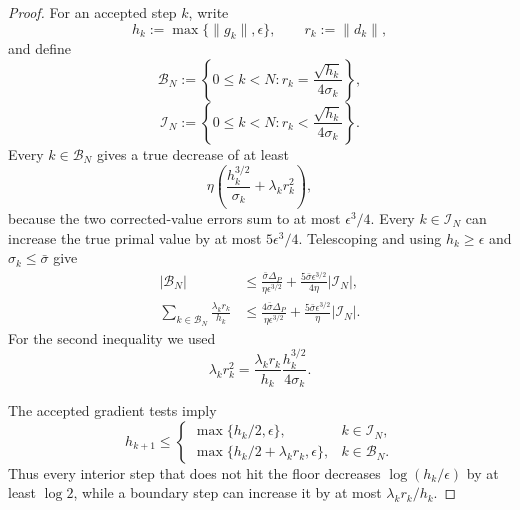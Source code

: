 \begin{proof}
For an accepted step $k$, write
\[
    h_k:=\max\{\|g_k\|,\epsilon\},
    \qquad
    r_k:=\|d_k\|,
\]
and define
\[
    \mathcal B_N
    :=
    \left\{
        0\le k<N:
        r_k=\frac{\sqrt{h_k}}{4\sigma_k}
    \right\},
\]
\[
    \mathcal I_N
    :=
    \left\{
        0\le k<N:
        r_k<\frac{\sqrt{h_k}}{4\sigma_k}
    \right\}.
\]
Every $k\in\mathcal B_N$ gives a true decrease of at least
\[
    \eta
    \left(
        \frac{h_k^{3/2}}{\sigma_k}
        +
        \lambda_kr_k^2
    \right),
\]
because the two corrected-value errors sum to at most
$\epsilon^3/4$.
Every $k\in\mathcal I_N$ can increase the true primal value by at
most $5\epsilon^3/4$.
Telescoping and using
$h_k\ge\epsilon$ and $\sigma_k\le\bar\sigma$ give
\begin{subequations}
\label{eq:pf-boundary-budgets}
\begin{align}
    |\mathcal B_N|
    &\le
    \frac{
        \bar\sigma\Delta_P
    }{
        \eta\epsilon^{3/2}
    }
    +
    \frac{
        5\bar\sigma\epsilon^{3/2}
    }{
        4\eta
    }
    |\mathcal I_N|,
    \label{eq:pf-boundary-count}
    \\
    \sum_{k\in\mathcal B_N}
    \frac{\lambda_kr_k}{h_k}
    &\le
    \frac{
        4\bar\sigma\Delta_P
    }{
        \eta\epsilon^{3/2}
    }
    +
    \frac{
        5\bar\sigma\epsilon^{3/2}
    }{
        \eta
    }
    |\mathcal I_N|.
    \label{eq:pf-multiplier-budget}
\end{align}
\end{subequations}
For the second inequality we used
\[
    \lambda_kr_k^2
    =
    \frac{\lambda_kr_k}{h_k}
    \frac{h_k^{3/2}}{4\sigma_k}.
\]

The accepted gradient tests imply
\[
    h_{k+1}
    \le
    \begin{cases}
        \max\{h_k/2,\epsilon\},
        &k\in\mathcal I_N,
        \\
        \max\{h_k/2+\lambda_kr_k,\epsilon\},
        &k\in\mathcal B_N.
    \end{cases}
\]
Thus every interior step that does not hit the floor decreases
$\log(h_k/\epsilon)$ by at least $\log2$, while a boundary step can
increase it by at most $\lambda_kr_k/h_k$.


\end{proof}
